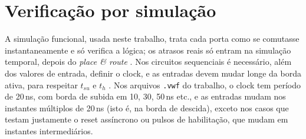 \section{Verificação por simulação}

A simulação funcional, usada neste trabalho, trata cada porta como se comutasse instantaneamente e só verifica a lógica; os atrasos reais só entram na simulação temporal, depois do \textit{place \& route} \cite{aula2}. Nos circuitos sequenciais é necessário, além dos valores de entrada, definir o clock, e as entradas devem mudar longe da borda ativa, para respeitar $t_{su}$ e $t_h$ \cite{aula1}. Nos arquivos \texttt{.vwf} do trabalho, o clock tem período de 20\,ns, com borda de subida em 10, 30, 50\,ns etc., e as entradas mudam nos instantes múltiplos de 20\,ns (isto é, na borda de descida), exceto nos casos que testam justamente o reset assíncrono ou pulsos de habilitação, que mudam em instantes intermediários.
